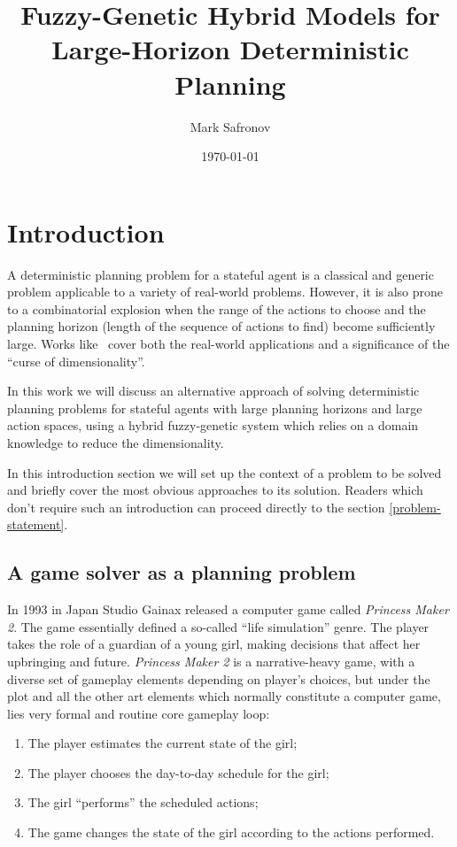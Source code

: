\documentclass[12pt, a4paper]{report}
\title{Fuzzy-Genetic Hybrid Models for Large-Horizon Deterministic Planning}
\author{Mark Safronov}
\date{\today}
\begin{document}
	
	
	
	\tableofcontents
	
	\chapter{Introduction}
	
	A deterministic planning problem for a stateful agent is a classical and generic problem applicable to a variety of real-world problems.
	However, it is also prone to a combinatorial explosion when the range of the actions to choose and the planning horizon (length of the sequence of actions to find) become sufficiently large.
	Works like~\cite{WOS:001308319900003} cover both the real-world applications and a significance of the ``curse of dimensionality''.
	
	In this work we will discuss an alternative approach of solving deterministic planning problems for stateful agents with large planning horizons and large action spaces, using a hybrid fuzzy-genetic system which relies on a domain knowledge to reduce the dimensionality.
	
	In this introduction section we will set up the context of a problem to be solved and briefly cover the most obvious approaches to its solution.
	Readers which don't require such an introduction can proceed directly to the section \ref{problem-statement}.
	
	\section{A game solver as a planning problem}

	In 1993 in Japan Studio Gainax released a computer game called \textit{Princess Maker 2}.
	The game essentially defined a so-called ``life simulation'' genre.
	The player takes the role of a guardian of a young girl, making decisions that affect her upbringing and future.
	\textit{Princess Maker 2} is a narrative-heavy game, with a diverse set of gameplay elements depending on player's choices, but under the plot and all the other art elements which normally constitute a computer game, lies very formal and routine core gameplay loop:
	
	\begin{enumerate}
		\item The player estimates the current state of the girl;
		\item The player chooses the day-to-day schedule for the girl;
		\item The girl ``performs'' the scheduled actions;
		\item The game changes the state of the girl according to the actions performed.
	\end{enumerate}
	
\end{document}
